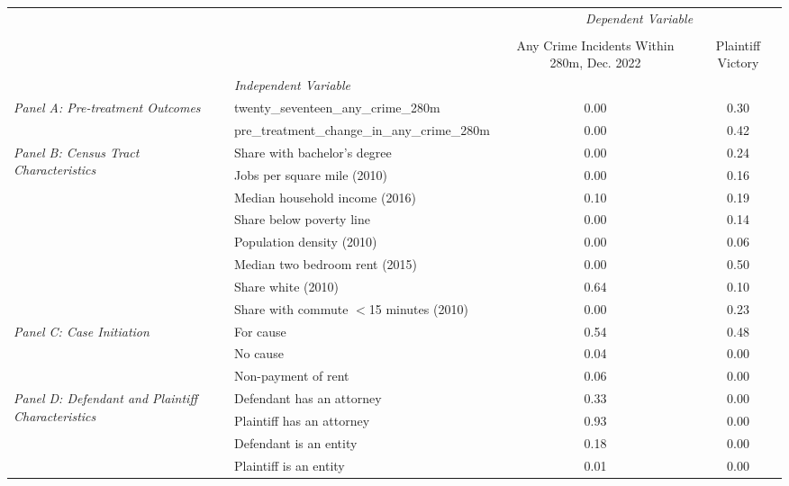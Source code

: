 \begin{tabular}{llcc}
\toprule
 &  & \multicolumn{2}{c}{\textit{Dependent Variable}} \\
\cline{3-4}
\\
 &  & Any Crime Incidents Within 280m, Dec. 2022 & Plaintiff Victory \\
 & \emph{Independent Variable} &  &  \\
\midrule
\multirow[c]{2}{3cm}{\textit{Panel A: Pre-treatment Outcomes}} & twenty_seventeen_any_crime_280m & 0.00 & 0.30 \\
 & pre_treatment_change_in_any_crime_280m & 0.00 & 0.42 \\
\cline{1-4}
\multirow[c]{8}{3cm}{\textit{Panel B: Census Tract Characteristics}} & Share with bachelor's degree & 0.00 & 0.24 \\
 & Jobs per square mile (2010) & 0.00 & 0.16 \\
 & Median household income (2016) & 0.10 & 0.19 \\
 & Share below poverty line & 0.00 & 0.14 \\
 & Population density (2010) & 0.00 & 0.06 \\
 & Median two bedroom rent (2015) & 0.00 & 0.50 \\
 & Share white (2010) & 0.64 & 0.10 \\
 & Share with commute $<$15 minutes (2010) & 0.00 & 0.23 \\
\cline{1-4}
\multirow[c]{3}{3cm}{\textit{Panel C: Case Initiation}} & For cause & 0.54 & 0.48 \\
 & No cause & 0.04 & 0.00 \\
 & Non-payment of rent & 0.06 & 0.00 \\
\cline{1-4}
\multirow[c]{4}{3cm}{\textit{Panel D: Defendant and Plaintiff Characteristics}} & Defendant has an attorney & 0.33 & 0.00 \\
 & Plaintiff has an attorney & 0.93 & 0.00 \\
 & Defendant is an entity & 0.18 & 0.00 \\
 & Plaintiff is an entity & 0.01 & 0.00 \\
\cline{1-4}
\bottomrule
\end{tabular}

